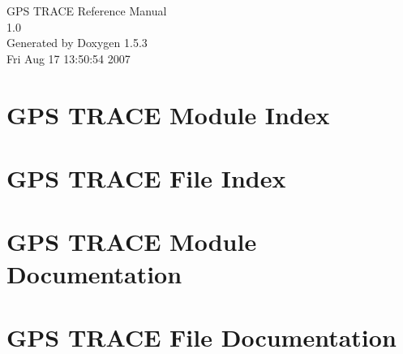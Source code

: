 \documentclass[a4paper]{book}
\begin{document}
\begin{titlepage}
\vspace*{7cm}
\begin{center}
{\Large GPS TRACE Reference Manual\\[1ex]\large 1.0 }\\
\vspace*{1cm}
{\large Generated by Doxygen 1.5.3}\\
\vspace*{0.5cm}
{\small Fri Aug 17 13:50:54 2007}\\
\end{center}
\end{titlepage}
\clearemptydoublepage
{}
\tableofcontents
\clearemptydoublepage
{}
\chapter{GPS TRACE Module Index}

\chapter{GPS TRACE File Index}

\chapter{GPS TRACE Module Documentation}

\chapter{GPS TRACE File Documentation}















\printindex
\end{document}
